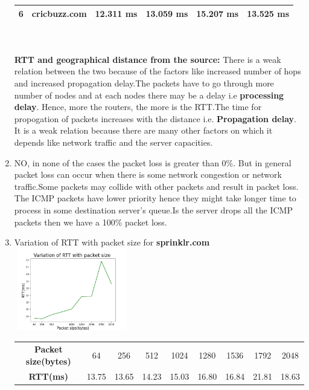 \documentclass[a4paper,11pt]{article}
\begin{document}
\begin{enumerate}[itemsep=-3pt,label=(\alph*)]
\begin{tabular}{|c|c|c|c|c|c|}
	\rowcolor[RGB]{0, 247, 255}
	6&cricbuzz.com & 12.311 ms & 13.059 ms &15.207 ms&13.525 ms
	\\ \hline
	\end{tabular}\\ \\
    \textbf{RTT and geographical distance from the source:} There is a weak relation between the two because of the factors like increased number of hops and increased propagation delay.The packets have to go through more number of nodes and at each nodes there may be a delay i.e \textbf{processing delay}. Hence, more the routers, the more is the RTT.The time for propogation of packets increases with the distance i.e. \textbf{Propagation delay}. It is a weak relation because there are many other factors on which it depends like network traffic and the server capacities. 
    \item NO, in none of the cases the packet loss is greater than 0\%. 
    But in general packet loss can occur when there is some network congestion or network traffic.Some packets may collide with other packets and result in packet loss. The ICMP packets have lower priority hence they might take longer time to process in some destination server’s queue.Is the server drops all the ICMP packets then we have a 100\% packet loss.
    \item Variation of RTT with packet size for 	\textcolor[RGB]{23,0,229}{\textbf{sprinklr.com}}\\
    \includegraphics[height=36mm,width=50mm]{ll}
    \hspace{180mm}\vspace{-30mm}
    \FloatBarrier
    \begin{table}[h]
    	\begin{tabular}{c|c|c|c|c|c|c|c|c|}
    		\hspace{55mm}\textbf{Packet size(bytes)}&64&256&512&1024&1280&1536&1792&2048\\
    		\hspace{55mm}\textbf{RTT(ms)}&13.75&13.65&14.23&15.03&16.80&16.84&21.81&18.63\\
    	\end{tabular}

\end{table}
\end{enumerate}
\end{document}
